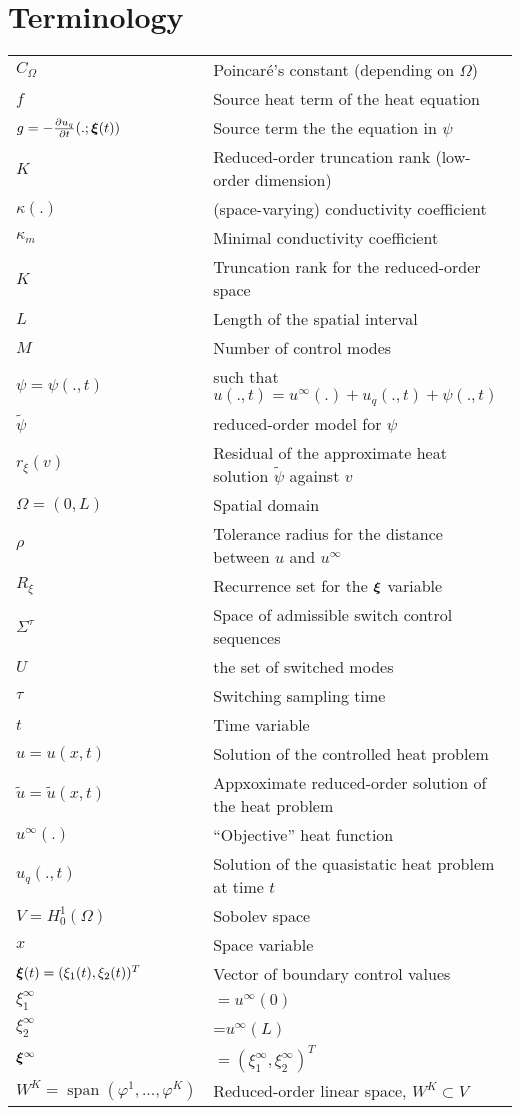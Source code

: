 
\graphicspath{{part_6/figures}{part_6/figures/}}

\section*{Terminology}
%
\begin{tabular}{ll}
$C_\Omega$ & Poincar\'e's constant (depending on $\Omega$) \\
$f$ & Source heat term of the heat equation \\
$g = -\frac{\partial u_q}{\partial t}(.;\bm{\xi}(t))$ & Source term the the equation in $\psi$\\
$K$ & Reduced-order truncation rank (low-order dimension) \\
$\kappa(.)$ & (space-varying) conductivity coefficient \\
$\kappa_m$ & Minimal conductivity coefficient \\
$K$ & Truncation rank for the reduced-order space \\
$L$ & Length of the spatial interval \\
$M$ & Number of control modes \\
$\psi=\psi(.,t)$ & such that $u(.,t) = u^\infty(.)+u_q(.,t) + \psi(.,t)$ \\
$\tilde \psi$ & reduced-order model for $\psi$ \\
$r_\xi(v)$ & Residual of the approximate heat solution $\tilde \psi$ against $v$ \\
$\Omega=(0,L)$ & Spatial domain \\
$\rho$ & Tolerance radius for the distance between $u$ and $u^\infty$ \\
$R_\xi$ & Recurrence set for the $\bm{\xi}$ variable \\
$\Sigma^\tau$ & Space of admissible switch control sequences \\
$U$ & the set of switched modes \\
$\tau$ & Switching sampling time \\
$t$ & Time variable \\
$u=u(x,t)$ & Solution of the controlled heat problem \\
$\tilde u=\tilde u(x,t)$ & Appxoximate reduced-order solution of the heat problem \\
$u^\infty(.)$ & ``Objective'' heat function \\
$u_q(.,t)$ & Solution of the quasistatic heat problem at time $t$ \\
$V=H^1_0(\Omega)$ & Sobolev space \\
$x$ & Space variable \\
$\bm{\xi}(t)=(\xi_1(t),\xi_2(t))^T$ & Vector of boundary control values \\
$\xi_1^\infty$ & $=u^\infty(0)$ \\
$\xi_2^\infty$ & =$u^\infty(L)$ \\
$\bm{\xi}^\infty$ & $=(\xi_1^\infty,\xi_2^\infty)^T$  \\
$W^K=\mathop{span}(\varphi^1,...,\varphi^K)$ & Reduced-order linear space, $W^K\subset V$
\end{tabular}
%

